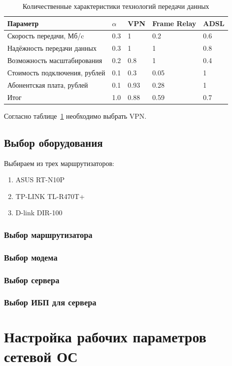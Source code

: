 \documentclass[russian,utf8,emptystyle]{eskdtext}
\begin{document}
\begin{longtable}{p{7cm}|p{1cm}|p{2cm}|p{2cm}|p{2cm}}
\caption{Количественные характеристики технологий передачи данных}
\label{tab:connect-3} \\
Параметр & $\alpha$ & VPN & Frame Relay & ADSL \\ 
\hline 
Скорость передачи, Мб/c      & 0.3 & 1    & 0.2  & 0.6   \\ 
Надёжность передачи данных   & 0.3 & 1    & 1    & 0.8   \\ 
Возможность масштабирования  & 0.2 & 0.8  & 1    & 0.4   \\ 
Стоимость подключения, рублей& 0.1 & 0.3  & 0.05 & 1     \\ 
Абонентская плата, рублей    & 0.1 & 0.93 & 0.28 & 1     \\
\hline
Итог                         & 1.0 & 0.88 & 0.59 & 0.7
\end{longtable}

Согласно таблице~\ref{tab:connect-3} необходимо выбрать VPN. 

\subsection{Выбор оборудования}
Выбираем из трех маршрутизаторов:
\begin{enumerate}[label=\arabic*.]
\item ASUS RT-N10P
\item TP-LINK TL-R470T+
\item D-link DIR-100
\end{enumerate}


\subsubsection{Выбор маршрутизатора}
\subsubsection{Выбор модема}
\subsubsection{Выбор сервера}
\subsubsection{Выбор ИБП для сервера}

\clearpage
\section{Настройка рабочих параметров сетевой ОС}
\end{document}
